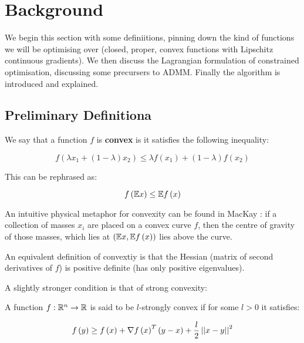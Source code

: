 \section{Background}\label{sec:admm}

We begin this section with some definiitions, pinning down the kind of functions we will be optimising over (closed, proper, convex functions with Lipschitz continuous gradients). We then discuss the Lagrangian formulation of constrained optimisation, discussing some precursers to ADMM. Finally the algorithm is introduced and explained.

\subsection{Preliminary Definitiona}

\begin{definition}[Convexity]
We say that a function \(f\) is \textbf{convex} is it satisfies the following inequality:

\begin{equation}
f\left(\lambda x_1 + \left(1-\lambda\right)x_2\right) \leq \lambda f\left(x_1\right) + \left(1-\lambda\right) f\left(x_2\right)
\end{equation}

This can be rephrased as:

\begin{equation}
f\left({\mathbb{E}}{x}\right) \leq {\mathbb{E}}{f\left(x\right)}
\end{equation}

An intuitive physical metaphor for convexity can be found in MacKay \cite{mackay2003information}: if a collection of masses \(x_i\) are placed on a convex curve \(f\), then the centre of gravity of those masses, which lies at \(\left({\mathbb{E}}{x}, {\mathbb{E}}{f\left(x\right)}\right)\) lies above the curve.

An equivalent definition of convextiy is that the Hessian (matrix of second derivatives of \(f\)) is positive definite (has only positive eigenvalues).
\end{definition}

A slightly stronger condition is that of strong convexity:

\begin{definition}
A function \(f: {\mathbb{R}}^n \rightarrow {\mathbb{R}}\) is said to be \(l\)-strongly convex if for some \(l > 0\) it satisfies:

\begin{equation}
f\left(y\right) \geq f\left(x\right) + \nabla f\left(x\right)^T \left(y-x\right) + \frac{l}{2}\left|\left|x-y\right|\right|^2
\end{equation}

\end{definition}

